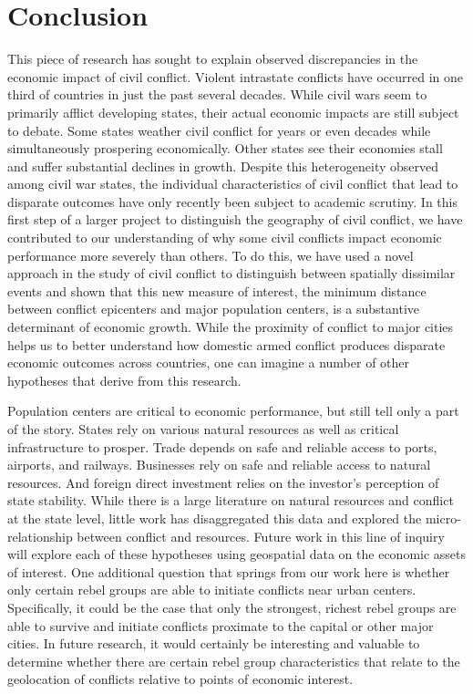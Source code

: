
\section{Conclusion}
\label{conclusion}

This piece of research has sought to explain observed discrepancies in the economic impact of civil conflict. Violent intrastate conflicts have occurred in one third of countries in just the past several decades. While civil wars seem to primarily afflict developing states, their actual economic impacts are still subject to debate. Some states weather civil conflict for years or even decades while simultaneously prospering economically. Other states see their economies stall and suffer substantial declines in growth. Despite this heterogeneity observed among civil war states, the individual characteristics of civil conflict that lead to disparate outcomes have only recently been subject to academic scrutiny. In this first step of a larger project to distinguish the geography of civil conflict, we have contributed to our understanding of why some civil conflicts impact economic performance more severely than others. To do this, we have used a novel approach in the study of civil conflict to distinguish between spatially dissimilar events and shown that this new measure of interest, the minimum distance between conflict epicenters and major population centers, is a substantive determinant of economic growth. While the proximity of conflict to major cities helps us to better understand how domestic armed conflict produces disparate economic outcomes across countries, one can imagine a number of other hypotheses that derive from this research.

Population centers are critical to economic performance, but still tell only a part of the story. States rely on various natural resources as well as critical infrastructure to prosper. Trade depends on safe and reliable access to ports, airports, and railways. Businesses rely on safe and reliable access to natural resources. And foreign direct investment relies on the investor's perception of state stability. While there is a large literature on natural resources and conflict at the state level, little work has disaggregated this data and explored the micro-relationship between conflict and resources. Future work in this line of inquiry will explore each of these hypotheses using geospatial data on the economic assets of interest. One additional question that springs from our work here is whether only certain rebel groups are able to initiate conflicts near urban centers. Specifically, it could be the case that only the strongest, richest rebel groups are able to survive and initiate conflicts proximate to the capital or other major cities. In future research, it would certainly be interesting and valuable to determine whether there are certain rebel group characteristics that relate to the geolocation of conflicts relative to points of economic interest.

